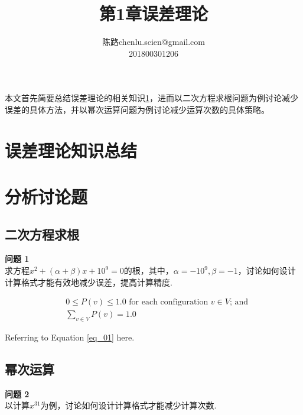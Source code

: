 \documentclass[UTF8]{ctexart}
\makeatletter
\newenvironment{problem}[2][问题]
    { \begin{mdframed}[backgroundcolor=gray!20] \textbf{#1 #2} \\}
    	{  \end{mdframed}}
\newcommand\assignmentNumber{1}
\newcommand\studentName{陈路}
\newcommand\studentEmail{chenlu.scien@gmail.com}
\newcommand\studentNumber{201800301206}
\makeatother
\begin{document}
    
    \title{第\assignmentNumber 章\quad 误差理论}
    
    \author{\name \studentName \email \studentEmail \\
    \studentNumber
    }
    
    \maketitle
本文首先简要总结误差理论的相关知识\ref{sec:background}，进而以二次方程求根问题为例讨论减少误差的具体方法，并以幂次运算问题为例讨论减少运算次数的具体策略。

\section{误差理论知识总结}
\label{sec:background}

\section{分析讨论题}

\subsection{二次方程求根}

\begin{problem}{1}
求方程$x^{2}+(\alpha+\beta) x+10^{9}=0$的根，其中，$\alpha=-10^{9}, \beta=-1$，讨论如何设计计算格式才能有效地减少误差，提高计算精度.
\end{problem}
\begin{align}
	&0 \leq P(v) \leq 1.0\text{ for each configuration $v \in V$; and}\\ \label{eq_01}		
	&\sum_{v \in V}{P(v)} = 1.0
\end{align}

Referring to Equation \ref{eq_01} here.

\subsection{幂次运算}

\begin{problem}{2}
	以计算$x^{31}$为例，讨论如何设计计算格式才能减少计算次数.
\end{problem}
\end{document}

